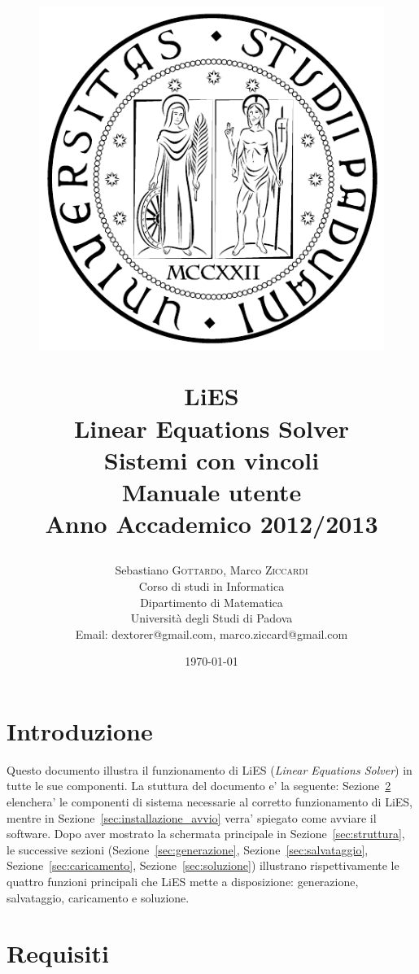 \documentclass{article}
\title{
\begin{figure}[ht]
\begin{center}
\includegraphics[scale=0.6]{./common-images/unipd_logo.pdf}
\end{center}
\end{figure}
LiES \\ Linear Equations Solver \\ Sistemi con vincoli \\\vspace{10mm} \textbf{Manuale utente}\\\vspace{0.4cm}
\Large{Anno Accademico 2012/2013}}
\author{Sebastiano \textsc{Gottardo}, Marco \textsc{Ziccardi}\\
Corso di studi in Informatica\\
Dipartimento di Matematica\\
Università degli Studi di Padova\\
Email: dextorer@gmail.com, marco.ziccard@gmail.com }
\date{\today} %
\begin{document}
\maketitle %



\newpage
\tableofcontents
\newpage


\section{Introduzione}
\label{sec:introduzione}

Questo documento illustra il funzionamento di LiES (\textit{Linear Equations Solver}) in tutte le sue componenti. La stuttura del documento e' la seguente: Sezione~\ref{sec:requisiti} elenchera' le componenti di sistema necessarie al corretto funzionamento di LiES, mentre in Sezione~\ref{sec:installazione_avvio} verra' spiegato come avviare il software. Dopo aver mostrato la schermata principale in Sezione~\ref{sec:struttura}, le successive sezioni (Sezione~\ref{sec:generazione}, Sezione~\ref{sec:salvataggio}, Sezione~\ref{sec:caricamento}, Sezione~\ref{sec:soluzione}) illustrano rispettivamente le quattro funzioni principali che LiES mette a disposizione: generazione, salvataggio, caricamento e soluzione.


\section{Requisiti}
\label{sec:requisiti}
\end{document}
